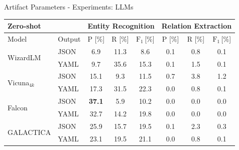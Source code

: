 \documentclass[en,16:9,smallfoot]{sdqbeamer}
\begin{document}
   \begin{frame}{Artifact Parameters - Experiments: LLMs}
    \begin{table}
     \begin{small}
      \centering
      \begin{tabular}{ll|ccc|ccc}
        \hline
        \multicolumn{2}{l|}{\textbf{Zero-shot}} &
        \multicolumn{3}{c|}{Entity Recognition} &
        \multicolumn{3}{c}{Relation Extraction} \\
        \hline
        Model & Output & P [\%] & R [\%] & $\text{F}_1$\,[\%] &
                         P [\%] & R [\%] & $\text{F}_1$\,[\%] \\
        \hline

        \multirow{2}{*}{WizardLM} &
        JSON & 6.9 & 11.3 & 8.6
                  & 0.1 & 0.8 & 0.1 \\
        \ & YAML & 9.7 & 35.6 &
        \hphantom{${}_{\Delta\text{+6.7}}$}
        15.3{\color{parametergreen}{${}_{\Delta\text{+6.7}}$}}
                  & 0.1 & 1.5 &
        \hphantom{${}_{\Delta\text{+0.0}}$}
        0.1{\color{contextgrey}{${}_{\Delta\text{+0.0}}$}}  \\
        \cline{1-2}

        \multirow{2}{*}{Vicuna${}_{4k}$} &
        JSON & 15.1 & 9.3 & 11.5
                  & 0.7 & 3.8 & 1.2 \\
        \ & YAML & 17.3 & 31.5 &
        \hphantom{${}_{\Delta\text{+10.8}}$}
        22.3{\color{parametergreen}{${}_{\Delta\text{+10.8}}$}}
                  & 0.0 & 0.8 &
        \hphantom{${}_{\Delta\text{-1.1}}$}
        0.1{\color{valuered}{${}_{\Delta\text{-1.1}}$}}  \\
        \cline{1-2}

        \multirow{2}{*}{Falcon} &
        JSON & \textbf{37.1} & 5.9 & 10.2
                  & 0.0 & 0.0 & 0.0 \\
        \ & YAML & 32.7 & 14.2 &
        \hphantom{${}_{\Delta\text{+9.6}}$}
        19.8{\color{parametergreen}{${}_{\Delta\text{+9.6}}$}}
                  & 0.0 & 0.0 &
        \hphantom{${}_{\Delta\text{+0.0}}$}
        0.0{\color{contextgrey}{${}_{\Delta\text{+0.0}}$}}  \\
        \cline{1-2}

        \multirow{2}{*}{GALACTICA} &
        JSON & 25.9 & 15.7 & 19.5
                  & 0.1 & 2.3 & 0.3 \\
        \ & YAML & 23.1 & 19.5 &
        \hphantom{${}_{\Delta\text{+1.6}}$}
        21.1{\color{parametergreen}{${}_{\Delta\text{+1.6}}$}}
                  & 0.0 & 0.8 &
        \hphantom{${}_{\Delta\text{-0.2}}$}
        0.1{\color{valuered}{${}_{\Delta\text{-0.2}}$}}  \\
        \cline{1-2}


\end{tabular}
\end{small}
\end{table}
\end{frame}
\end{document}
